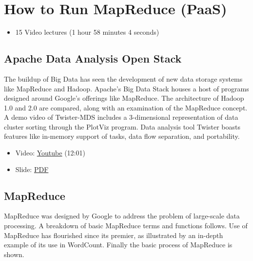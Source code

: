 \FILENAME


\section{How to Run MapReduce (PaaS)}\label{how-to-run-mapreduce-paas}

\begin{itemize}

\item
  15 Video lectures (1 hour 58 minutes 4 seconds)
\end{itemize}

\subsection{Apache Data Analysis Open
Stack}\label{apache-data-analysis-open-stack}

The buildup of Big Data has seen the development of new data storage
systems like MapReduce and Hadoop. Apache's Big Data Stack houses a host
of programs designed around Google's offerings like MapReduce. The
architecture of Hadoop 1.0 and 2.0 are compared, along with an
examination of the MapReduce concept. A demo video of Twister-MDS
includes a 3-dimensional representation of data cluster sorting through
the PlotViz program. Data analysis tool Twister boasts features like
in-memory support of tasks, data flow separation, and portability.

\begin{itemize}

\item
  Video: \href{https://www.youtube.com/watch?v=6vkgvGtyv4Q}{Youtube}
  (12:01)
\end{itemize}

\begin{itemize}

\item
  Slide:
  \href{https://drive.google.com/open?id=0B88HKpainTSfMnpCelpNQUpNdVE}{PDF}
\end{itemize}

\subsection{MapReduce}\label{mapreduce}

MapReduce was designed by Google to address the problem of large-scale
data processing. A breakdown of basic MapReduce terms and functions
follows. Use of MapReduce has flourished since its premier, as
illustrated by an in-depth example of its use in WordCount. Finally the
basic process of MapReduce is shown.

